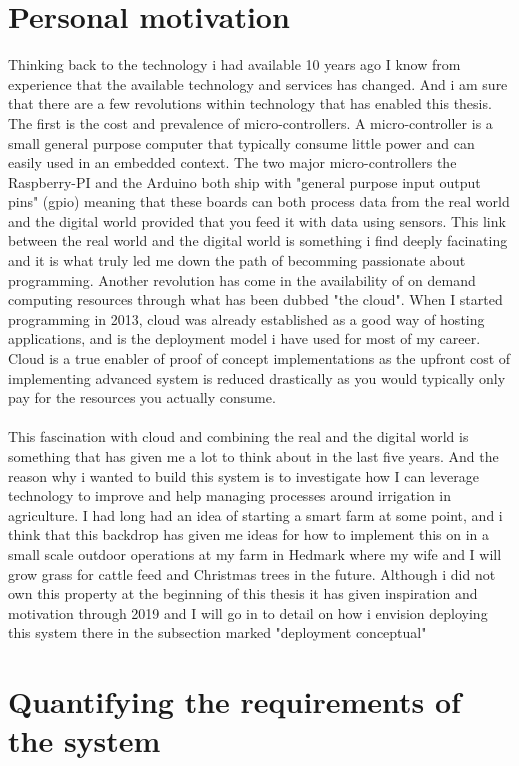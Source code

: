 \documentclass[]{uiophd}
\begin{document}
\section{Personal motivation}
Thinking back to the technology i had available 10 years ago I know from experience that the available technology and services has changed. And i am sure that there are a few revolutions within technology that has enabled this thesis. The first is the cost and prevalence of micro-controllers. A micro-controller is a small general purpose computer that typically consume little power and can easily used in an embedded context. The two major micro-controllers the Raspberry-PI and the Arduino both ship with "general purpose input output pins" (gpio) meaning that these boards can both process data from the real world and the digital world provided that you feed it with data using sensors. This link between the real world and the digital world is something i find deeply facinating and it is what truly led me down the path of becomming passionate about programming. Another revolution has come in the availability of on demand computing resources through what has been dubbed "the cloud". When I started programming in 2013, cloud was already established as a good way of hosting applications, and is the deployment model i have used for most of my career. Cloud is a true enabler of proof of concept implementations as the upfront cost of implementing advanced system is reduced drastically as you would typically only pay for the resources you actually consume.
\\\\
This fascination with cloud and combining the real and the digital world is something that has given me a lot to think about in the last five years. And the reason why i wanted to build this system is to investigate how I can leverage technology to improve and help managing processes around irrigation in agriculture. I had long had an idea of starting a smart farm at some point, and i think that this backdrop has given me ideas for how to implement this on in a small scale outdoor operations at my farm in Hedmark where my wife and I will grow grass for cattle feed and Christmas trees in the future. Although i did not own this property at the beginning of this thesis it has given inspiration and motivation through 2019 and I will go in to detail on how i envision deploying this system there in the subsection marked "deployment conceptual"

\section{Quantifying the requirements of the system}
\end{document}
